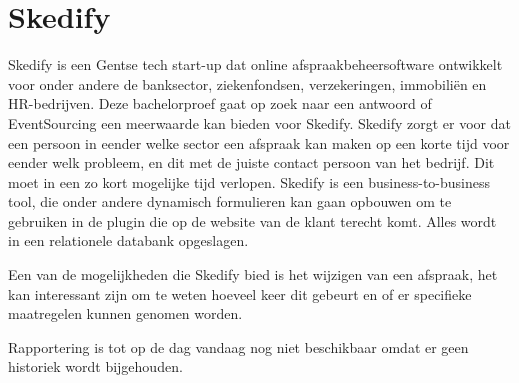 
\chapter{Skedify}
\label{ch:skedify}

Skedify is een Gentse tech start-up dat online afspraakbeheersoftware ontwikkelt voor onder andere de banksector, ziekenfondsen, verzekeringen, immobiliën en HR-bedrijven. Deze bachelorproef gaat op zoek naar een antwoord of EventSourcing een meerwaarde kan bieden voor Skedify. Skedify zorgt er voor dat een persoon in eender welke sector een afspraak kan maken op een korte tijd voor eender welk probleem, en dit met de juiste contact persoon van het bedrijf. Dit moet in een zo kort mogelijke tijd verlopen. Skedify is een business-to-business tool, die onder andere dynamisch formulieren kan gaan opbouwen om te gebruiken in de plugin die op de website van de klant terecht komt. Alles wordt in een relationele databank opgeslagen.

Een van de mogelijkheden die Skedify bied is het wijzigen van een afspraak, het kan interessant zijn om te weten hoeveel keer dit gebeurt en of er specifieke maatregelen kunnen genomen worden.

Rapportering is tot op de dag vandaag nog niet beschikbaar omdat er geen historiek wordt bijgehouden.